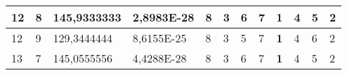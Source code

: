 \documentclass[conference]{IEEEtran}
\begin{document}
\begin{table*}[]
\begin{tabular}{|llll|llllllll|}
\multicolumn{1}{|l|}{12}                                                             & \multicolumn{1}{l|}{8}                                                                 & \multicolumn{1}{l|}{145,9333333}                                                           & 2,8983E-28                              & \multicolumn{1}{l|}{8}                                                           & \multicolumn{1}{l|}{3}                                                           & \multicolumn{1}{l|}{6}                                                           & \multicolumn{1}{l|}{7}                                                           & \multicolumn{1}{l|}{\textbf{1}}                                                  & \multicolumn{1}{l|}{4}                                                           & \multicolumn{1}{l|}{5}                                                           & 2                                   \\ \hline
\multicolumn{1}{|l|}{12}                                                             & \multicolumn{1}{l|}{9}                                                                 & \multicolumn{1}{l|}{129,3444444}                                                           & 8,6155E-25                              & \multicolumn{1}{l|}{8}                                                           & \multicolumn{1}{l|}{3}                                                           & \multicolumn{1}{l|}{5}                                                           & \multicolumn{1}{l|}{7}                                                           & \multicolumn{1}{l|}{\textbf{1}}                                                  & \multicolumn{1}{l|}{4}                                                           & \multicolumn{1}{l|}{6}                                                           & 2                                   \\ \hline
\multicolumn{1}{|l|}{13}                                                             & \multicolumn{1}{l|}{7}                                                                 & \multicolumn{1}{l|}{145,0555556}                                                           & 4,4288E-28                              & \multicolumn{1}{l|}{8}                                                           & \multicolumn{1}{l|}{3}                                                           & \multicolumn{1}{l|}{6}                                                           & \multicolumn{1}{l|}{7}                                                           & \multicolumn{1}{l|}{\textbf{1}}                                                  & \multicolumn{1}{l|}{4}                                                           & \multicolumn{1}{l|}{5}                                                           & 2                                   \\ \hline

\end{tabular}
\end{table*}
\end{document}
